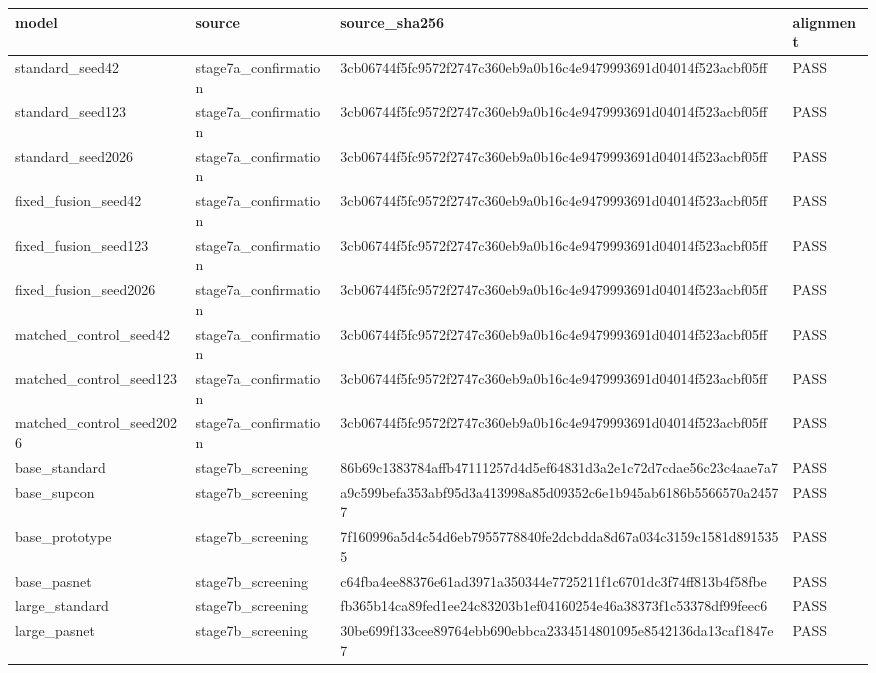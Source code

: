 \begin{tabular}{llll}
\toprule
model & source & source\_sha256 & alignment \\
\midrule
standard\_seed42 & stage7a\_confirmation & 3cb06744f5fc9572f2747c360eb9a0b16c4e9479993691d04014f523acbf05ff & PASS \\
standard\_seed123 & stage7a\_confirmation & 3cb06744f5fc9572f2747c360eb9a0b16c4e9479993691d04014f523acbf05ff & PASS \\
standard\_seed2026 & stage7a\_confirmation & 3cb06744f5fc9572f2747c360eb9a0b16c4e9479993691d04014f523acbf05ff & PASS \\
fixed\_fusion\_seed42 & stage7a\_confirmation & 3cb06744f5fc9572f2747c360eb9a0b16c4e9479993691d04014f523acbf05ff & PASS \\
fixed\_fusion\_seed123 & stage7a\_confirmation & 3cb06744f5fc9572f2747c360eb9a0b16c4e9479993691d04014f523acbf05ff & PASS \\
fixed\_fusion\_seed2026 & stage7a\_confirmation & 3cb06744f5fc9572f2747c360eb9a0b16c4e9479993691d04014f523acbf05ff & PASS \\
matched\_control\_seed42 & stage7a\_confirmation & 3cb06744f5fc9572f2747c360eb9a0b16c4e9479993691d04014f523acbf05ff & PASS \\
matched\_control\_seed123 & stage7a\_confirmation & 3cb06744f5fc9572f2747c360eb9a0b16c4e9479993691d04014f523acbf05ff & PASS \\
matched\_control\_seed2026 & stage7a\_confirmation & 3cb06744f5fc9572f2747c360eb9a0b16c4e9479993691d04014f523acbf05ff & PASS \\
base\_standard & stage7b\_screening & 86b69c1383784affb47111257d4d5ef64831d3a2e1c72d7cdae56c23c4aae7a7 & PASS \\
base\_supcon & stage7b\_screening & a9c599befa353abf95d3a413998a85d09352c6e1b945ab6186b5566570a24577 & PASS \\
base\_prototype & stage7b\_screening & 7f160996a5d4c54d6eb7955778840fe2dcbdda8d67a034c3159c1581d8915355 & PASS \\
base\_pasnet & stage7b\_screening & c64fba4ee88376e61ad3971a350344e7725211f1c6701dc3f74ff813b4f58fbe & PASS \\
large\_standard & stage7b\_screening & fb365b14ca89fed1ee24c83203b1ef04160254e46a38373f1c53378df99feec6 & PASS \\
large\_pasnet & stage7b\_screening & 30be699f133cee89764ebb690ebbca2334514801095e8542136da13caf1847e7 & PASS \\
\bottomrule
\end{tabular}
